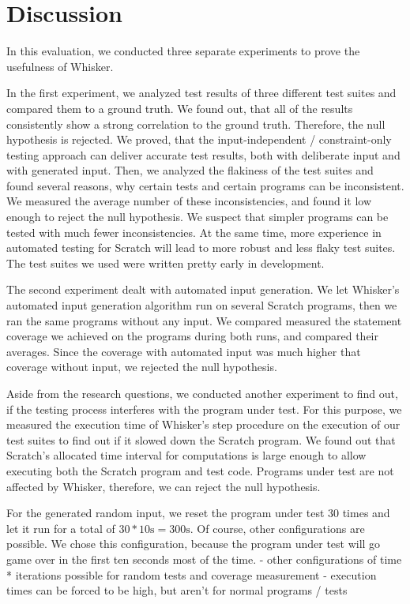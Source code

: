 \section{Discussion}
\label{sec:discussion}

In this evaluation, we conducted three separate experiments to prove the usefulness of Whisker.
\parspace

In the first experiment, we analyzed test results of three different test suites and compared them to a ground truth.
We found out, that all of the results consistently show a strong correlation to the ground truth.
Therefore, the null hypothesis is rejected.
We proved, that the input-independent / constraint-only testing approach can deliver accurate test results,
both with deliberate input and with generated input.
Then, we analyzed the flakiness of the test suites and found several reasons,
why certain tests and certain programs can be inconsistent.
We measured the average number of these inconsistencies,
and found it low enough to reject the null hypothesis.
We suspect that simpler programs can be tested with much fewer inconsistencies.
At the same time, more experience in automated testing for Scratch will lead to more robust and less flaky test suites.
The test suites we used were written pretty early in development.
\parspace

The second experiment dealt with automated input generation.
We let Whisker's automated input generation algorithm run on several Scratch programs,
then we ran the same programs without any input.
We compared measured the statement coverage we achieved on the programs during both runs,
and compared their averages.
Since the coverage with automated input was much higher that coverage without input,
we rejected the null hypothesis.
\parspace

Aside from the research questions, we conducted another experiment to find out,
if the testing process interferes with the program under test.
For this purpose, we measured the execution time of Whisker's step procedure on the execution of our test suites
to find out if it slowed down the Scratch program.
We found out that Scratch's allocated time interval for computations is large enough to
allow executing both the Scratch program and test code.
Programs under test are not affected by Whisker, therefore, we can reject the null hypothesis.



For the generated random input, we reset the program under test 30 times and let it run for a total of $30 * 10\text{s} = 300\text{s}$.
Of course, other configurations are possible.
We chose this configuration, because the program under test will go game over in the first ten seconds most of the time.
- other configurations of time * iterations possible for random tests and coverage measurement
- execution times can be forced to be high, but aren't for normal programs / tests

